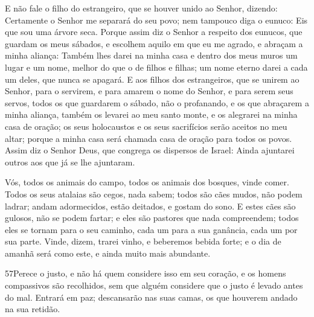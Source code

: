 E não fale o filho do estrangeiro, que se houver unido ao Senhor,
dizendo: Certamente o Senhor me separará do seu povo; nem tampouco
diga o eunuco: Eis que sou uma árvore seca.
 Porque assim diz o Senhor a respeito dos eunucos, que guardam os
meus sábados, e escolhem aquilo em que eu me agrado, e abraçam a
minha aliança: Também lhes darei na minha casa e dentro dos meus
muros um lugar e um nome, melhor do que o de filhos e filhas; um
nome eterno darei a cada um deles, que nunca se apagará. E aos
filhos dos estrangeiros, que se unirem ao Senhor, para o servirem, e
para amarem o nome do Senhor, e para serem seus servos, todos os que
guardarem o sábado, não o profanando, e os que abraçarem a minha
aliança, também os levarei ao meu santo monte, e os alegrarei na
minha casa de oração; os seus holocaustos e os seus sacrifícios
serão aceitos no meu altar; porque a minha casa será chamada casa de
oração para todos os povos. Assim diz o Senhor Deus, que
congrega os dispersos de Israel: Ainda ajuntarei outros aos que já
se lhe ajuntaram.

Vós, todos os animais do campo, todos os animais dos bosques,
vinde comer. Todos os seus atalaias são cegos, nada sabem;
todos são cães mudos, não podem ladrar; andam adormecidos, estão
deitados, e gostam do sono. E estes cães são gulosos, não se
podem fartar; e eles são pastores que nada compreendem; todos eles
se tornam para o seu caminho, cada um para a sua ganância, cada um
por sua parte. Vinde, dizem, trarei vinho, e beberemos bebida
forte; e o dia de amanhã será como este, e ainda muito mais
abundante.

\medskip

\lettrine{57}{}Perece o justo, e não há quem considere isso em
seu coração, e os homens compassivos são recolhidos, sem que alguém
considere que o justo é levado antes do mal. Entrará em paz;
descansarão nas suas camas, os que houverem andado na sua retidão.

